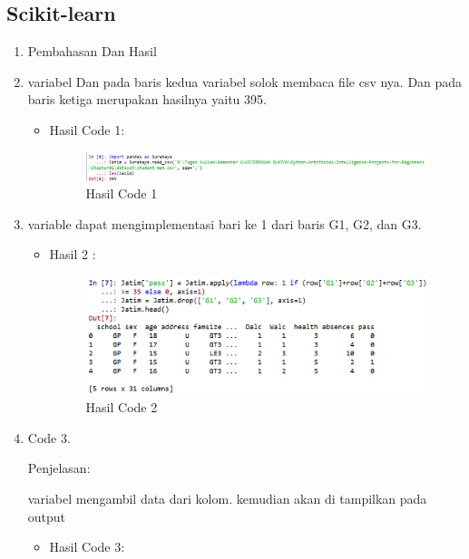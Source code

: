 \subsection{Scikit-learn}
\begin{enumerate}
\item Pembahasan Dan Hasil
\item variabel  Dan pada baris kedua variabel solok membaca file csv nya. Dan pada baris ketiga merupakan hasilnya yaitu 395.
\begin{itemize}

\item Hasil Code 1:
\begin{figure}[ht]
\centering
\includegraphics[scale=0.4]{figures/andi/gg1.PNG}
\caption{Hasil Code 1}
\label{contoh}
\end{figure}

\end{itemize}

\item variable dapat mengimplementasi bari ke 1 dari baris G1, G2, dan G3.
\begin{itemize}
\item Hasil 2 :

\begin{figure}[ht]
\centering
\includegraphics[scale=0.4]{figures/andi/gg2.PNG}
\caption{Hasil Code 2}
\label{contoh}
\end{figure}

\end{itemize}

\item Code 3.

Penjelasan:

variabel mengambil data dari kolom. kemudian akan di tampilkan pada output
\begin{itemize}


\item Hasil Code 3:


\end{itemize}
\end{enumerate}
